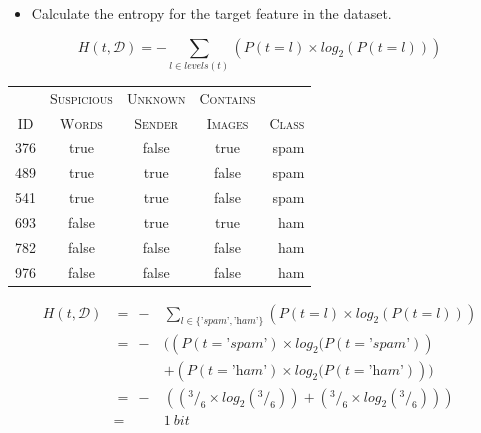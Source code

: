 \documentclass[xcolor={table}]{beamer}
\newcommand{\featN}[1]{\textsc{#1}}
\newcommand{\featL}[1]{\textit{'#1'}}
\begin{document}
\begin{frame}
	\begin{itemize}
		\item Calculate the \alert{entropy} for the target feature in the dataset.
	\end{itemize}
	\begin{equation*}
H\left(t, \mathcal{D}\right) = - \sum_{l \in levels(t)} \left( P(t=l) \times log_2(P(t=l)) \right)
\label{eq:hds}
\end{equation*}
	\begin{table}[!hbt]
\centering
\begin{footnotesize}
\begin{tabular}{ccccr}
\hline
	 & \featN{Suspicious}	& \featN{Unknown}	 & \featN{Contains}	 & \featN{} \\
\featN{ID}	 & \featN{Words}	& \featN{Sender}	 & \featN{Images}	 & \featN{Class} \\
\hline
376	 & true	 & false 	 & true	& spam \\
489	 & true	 & true 	 & false	& spam \\
541	 & true	 & true 	 & false	& spam \\
693	 & false	 & true 	 & true	& ham \\
782	 & false	 & false 	 & false	& ham \\
976	 & false	 & false 	 & false	& ham \\
\hline
\end{tabular}
\end{footnotesize}
\end{table}
\end{frame}


 \begin{frame} 
\begin{footnotesize}
\begin{equation*}
	\begin{alignedat}{2}
H\left(t, \mathcal{D}\right) &=~-& \sum_{l \in \{\featL{spam}, \featL{ham}\}} \left( P(t=l) \times log_2(P(t=l)) \right)\\
   &=~-& ( \left(P(t=\featL{spam}) \times log_2(P(t=\featL{spam})\right)\\
 && + \left(P(t=\featL{ham}) \times log_2(P(t=\featL{ham})\right) )\\
   &=~-& \left( \left( ^3/_6 \times log_2(^3/_6)\right) + \left(^3/_6  \times log_2(^3/_6) \right) \right)\\
&=& 1~bit
	\end{alignedat}
\label{eq:hdsspam}
\end{equation*}
\end{footnotesize}
\end{frame} 
\end{document}
